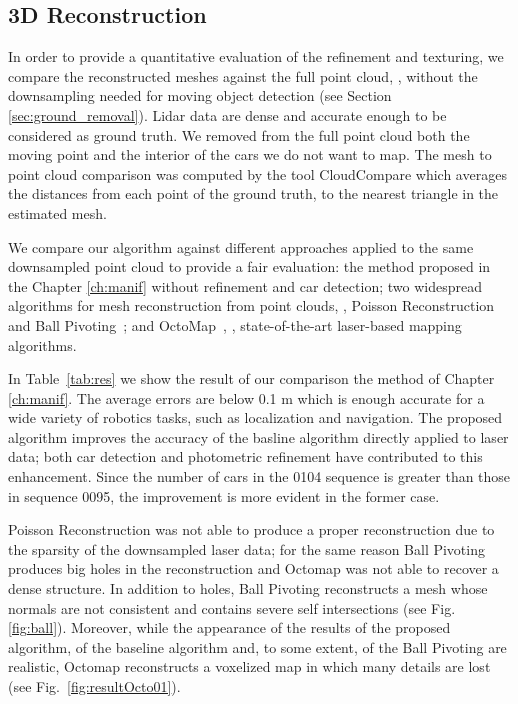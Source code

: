 \subsection{3D Reconstruction}

In order to provide a quantitative evaluation of the refinement and texturing, we compare the reconstructed meshes against the full point cloud, \ie, without the downsampling needed for moving object detection (see Section~ \ref{sec:ground_removal}). Lidar data are dense and accurate enough to be considered as ground truth. 
We removed from the full point cloud both the moving point and the interior of the cars we do not want to map.
The mesh to point cloud comparison was computed by the tool CloudCompare \cite{cloudcompare} which averages the distances from each point of the ground truth, to the  nearest triangle in the estimated mesh.

We compare our algorithm against different approaches applied to the same downsampled point cloud to provide a fair evaluation: the method proposed in the Chapter \ref{ch:manif} without refinement and car detection; two widespread algorithms for mesh reconstruction from point clouds, \ie, Poisson Reconstruction~\cite{kazhdan2006poisson} and Ball Pivoting~\cite{bernardini1999ball}; and OctoMap~\cite{hornung2013octomap}, \ie, state-of-the-art laser-based mapping algorithms.

In Table~\ref{tab:res} we show the result of our comparison  the method of Chapter \ref{ch:manif}.
The average errors are below 0.1 m which is enough accurate for a wide variety of robotics tasks, such as localization and navigation. 
The proposed algorithm improves the accuracy of the basline algorithm directly applied to laser data; both car detection and photometric refinement have contributed to this enhancement. 
Since the number of cars in the 0104 sequence is greater than those in sequence 0095, the improvement is more evident in the former case.

Poisson Reconstruction was not able to produce a proper reconstruction due to the sparsity of the downsampled laser data; for the same reason Ball Pivoting produces big holes in the reconstruction and Octomap was not able to recover a dense structure. 
In addition to holes, Ball Pivoting reconstructs a mesh whose normals are not consistent and contains severe self intersections (see Fig. \ref{fig:ball}).
Moreover, while the appearance of the results of the proposed algorithm, of the baseline algorithm and, to some extent, of the Ball Pivoting are realistic, Octomap reconstructs a voxelized map in which many details are lost (see  Fig.~\ref{fig:resultOcto01}).

